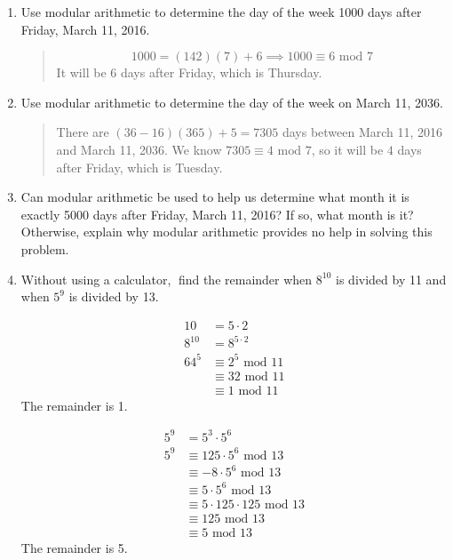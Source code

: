 \documentclass{hw}
\begin{document}
\begin{enumerate}
\item Use modular arithmetic to determine the day of the week 1000 days after Friday, March 11, 2016.
\begin{quote}
\[
1000 = (142)(7) + 6 \implies 1000\equiv6\text{ mod }7
\]
It will be 6 days after Friday, which is Thursday.
\end{quote}

\item Use modular arithmetic to determine the day of the week on March 11, 2036.
\begin{quote}
There are $(36-16)(365)+5=7305$ days between March 11, 2016 and March 11, 2036. We know
$7305\equiv4\text{ mod }7$, so it will be $4$ days after Friday, which is Tuesday.
\end{quote}

\item Can modular arithmetic be used to help us determine what month it is exactly 5000 days after Friday,
March 11, 2016?  If so, what month is it?  Otherwise, explain why modular arithmetic provides no help
in solving this problem.
\begin{quote}

\end{quote}

\item Without using a calculator, find the remainder when $8^{10}$ is divided by 11 and when $5^9$
is divided by 13.

\begin{minipage}[b]{0.5\textwidth}
\begin{align*}
10 &= 5 \cdot 2\\
8^{10} &= 8^{5\cdot2}\\
64^5&\equiv2^5\text{ mod }11\\
&\equiv32\text{ mod }11\\
&\equiv1\text{ mod }11
\end{align*}
The remainder is 1.
\end{minipage}
\begin{minipage}[b]{0.5\textwidth}
\begin{align*}
5^9 &= 5^3\cdot5^6\\
5^9 &\equiv 125\cdot5^6\text{ mod }13\\
&\equiv -8\cdot5^6\text{ mod }13\\
&\equiv 5\cdot5^6\text{ mod }13\\
&\equiv 5\cdot125\cdot125\text{ mod }13\\
&\equiv 125\text{ mod }13\\
&\equiv 5\text{ mod }13
\end{align*}
The remainder is 5.
\end{minipage}


\end{enumerate}
\end{document}
